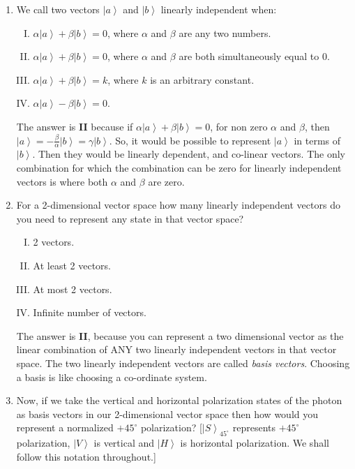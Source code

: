 \documentclass[12pt]{article}
\newcommand\rr{\right \rangle}
\newcommand\ls{\left |}
\newcommand\tbf[1]{\textbf{#1}}
\begin{document}
\begin{enumerate}[1.]
 	\item We call two vectors $\ls a \rr$ and $\ls b \rr$ linearly independent when:
 		\begin{enumerate}[I.]
 			\item $\alpha \ls a \rr + \beta \ls b \rr = 0$, where $\alpha$ and $\beta$ are any two numbers.
 			\item $\alpha \ls a \rr + \beta \ls b \rr = 0$, where $\alpha$ and $\beta$ are both simultaneously equal to $0$.
 			\item $\alpha \ls a \rr + \beta \ls b \rr = k$, where $k$ is an arbitrary constant.
 			\item $\alpha \ls a \rr - \beta \ls b \rr = 0$. \\ \newline
 		\end{enumerate}
 	The answer is \tbf{II} because if $\alpha \ls a \rr + \beta \ls b \rr = 0$, for non zero $\alpha$ and $\beta$, then $\ls a \rr = -\frac{\beta}{\alpha}\ls b \rr = \gamma \ls b \rr$. So, it would be possible to represent $\ls a \rr$ in terms of $\ls b \rr$. Then they would be linearly dependent, and co-linear vectors. The only combination for which the combination can be zero for linearly independent vectors is where both $\alpha$ and $\beta$ are zero.
 	\item For a 2-dimensional vector space how many linearly independent vectors do you need to represent any state in that vector space?
 		\begin{enumerate}[I.]
 			\item 2 vectors.
 			\item At least 2 vectors.
 			\item At most 2 vectors.
 			\item Infinite number of vectors. \\ \newline
 		\end{enumerate}
 		The answer is \tbf{II}, because you can represent a two dimensional vector as the linear combination of ANY two linearly independent vectors in that vector space. The two linearly independent vectors are called \emph{basis vectors}. Choosing a basis is like choosing a co-ordinate system.
 	\item Now, if we take the vertical and horizontal polarization states of the photon as basis vectors in our 2-dimensional vector space then how would you represent a normalized $+45^\circ$ polarization? [$\ls S \rr _{45^\circ}$ represents $+45^\circ$ polarization, $\ls V \rr$ is vertical and $\ls H \rr$ is horizontal polarization. We shall follow this notation throughout.]

\end{enumerate}
\end{document}
